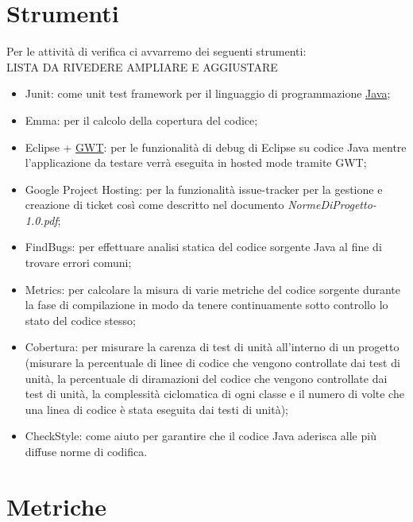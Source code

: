\section{Strumenti}

Per le attivit\`a di verifica ci avvarremo dei seguenti strumenti:\\

LISTA DA RIVEDERE AMPLIARE E AGGIUSTARE

\begin{itemize}

\item Junit: come unit test framework per il linguaggio di
programmazione \underline{Java};

\item Emma: per il calcolo della copertura del codice;

\item Eclipse + \underline{GWT}: per le funzionalit\`a di debug di Eclipse su
codice Java mentre l'applicazione da testare verr\`a eseguita in hosted mode
tramite GWT;

\item Google Project Hosting: per la funzionalit\`a issue-tracker
per la gestione e creazione di ticket cos\`i come descritto nel documento \emph{NormeDiProgetto-1.0.pdf};

\item FindBugs: per effettuare analisi statica del codice
sorgente Java al fine di trovare errori comuni;

\item Metrics: per calcolare la misura di varie metriche del
codice sorgente durante la fase di compilazione in modo da tenere continuamente
sotto controllo lo stato del codice stesso;

\item Cobertura: per misurare la carenza di test di unit\`a
all'interno di un progetto (misurare la percentuale di linee di codice che
vengono controllate dai test di unit\`a, la percentuale di diramazioni del
codice che vengono controllate dai test di unit\`a, la complessit\`a ciclomatica
di ogni classe e il numero di volte che una linea di codice \`e stata eseguita
dai testi di unit\`a);

\item CheckStyle: come aiuto per garantire che il codice Java
aderisca alle pi\`u diffuse norme di codifica.
\end{itemize}


\section{Metriche}

